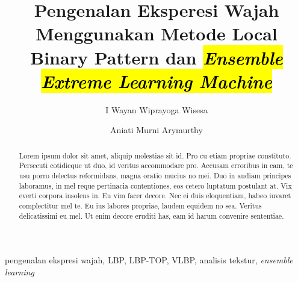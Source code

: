 \documentclass[review,3p,12pt]{elsarticle}
\begin{document}
\begin{frontmatter}



\title{Pengenalan Eksperesi Wajah Menggunakan Metode Local Binary Pattern dan \hl{\textit{Ensemble Extreme Learning Machine}}}


\author[csui]{I Wayan Wiprayoga Wisesa}
\author[csui]{Aniati Murni Arymurthy}


\address[csui]{Program Studi Magister Ilmu Komputer, Fakultas Ilmu Komputer, Universitas Indonesia\\
Depok, West Java, Indonesia}

\begin{abstract}
Lorem ipsum dolor sit amet, aliquip molestiae sit id. Pro cu etiam propriae constituto. Persecuti cotidieque ut duo, id veritus accommodare pro. Accusam erroribus in eam, te usu porro delectus reformidans, magna oratio mucius no mei. Duo in audiam principes laboramus, in mel reque pertinacia contentiones, eos cetero luptatum postulant at. Vix everti corpora insolens in. Eu vim facer decore. Nec ei duis eloquentiam, habeo iuvaret complectitur mel te. Eu ius labores propriae, laudem equidem no sea. Veritus delicatissimi eu mel. Ut enim decore eruditi has, eam id harum convenire sententiae.

\end{abstract}

\begin{keyword}
pengenalan ekspresi wajah, LBP, LBP-TOP, VLBP, analisis tekstur, \textit{ensemble learning}


\end{keyword}

\end{frontmatter}
\end{document}
